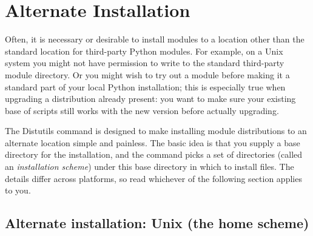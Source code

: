 \documentclass{howto}
\begin{document}
\newcommand{\installscheme}[8]
  {\begin{tableiii}{lll}{textrm}
          {Type of file}
          {Installation Directory}
          {Override option}
     \lineiii{pure module distribution}
             {\filevar{#1}\filenq{#2}}
             {\option{install-purelib}}
     \lineiii{non-pure module distribution}
             {\filevar{#3}\filenq{#4}}
             {\option{install-platlib}}
     \lineiii{scripts}
             {\filevar{#5}\filenq{#6}}
             {\option{install-scripts}}
     \lineiii{data}
             {\filevar{#7}\filenq{#8}}
             {\option{install-data}}
   \end{tableiii}}




\section{Alternate Installation}
\label{sec:alt-install}

Often, it is necessary or desirable to install modules to a location
other than the standard location for third-party Python modules.  For
example, on a Unix system you might not have permission to write to the
standard third-party module directory.  Or you might wish to try out a
module before making it a standard part of your local Python
installation; this is especially true when upgrading a distribution
already present: you want to make sure your existing base of scripts
still works with the new version before actually upgrading.

The Distutils  command is designed to make installing
module distributions to an alternate location simple and painless.  The
basic idea is that you supply a base directory for the installation, and
the  command picks a set of directories (called an
\emph{installation scheme}) under this base directory in which to
install files.  The details differ across platforms, so read whichever
of the following section applies to you.


\subsection{Alternate installation: Unix (the home scheme)}
\label{sec:alt-unix-prefix}
\end{document}
